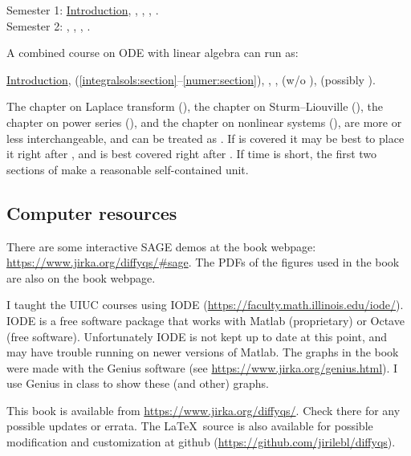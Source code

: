 \noindent
Semester 1:
\hyperref[intro:chapter]{Introduction},
,
,
,
.
\\
Semester 2: 
,
,
,
.

\medskip

A combined course on ODE with linear algebra can run as:

\medskip

\noindent
\hyperref[intro:chapter]{Introduction},
 (\ref{integralsols:section}--\ref{numer:section}),
,
,
 (w/o ), (possibly 
).

\medskip

The chapter on
Laplace transform (),
the chapter on Sturm--Liouville (),
the chapter on power series (),
and the chapter on nonlinear systems (),
are more or less interchangeable, and can be treated as .
If  is covered it may be best to place it right 
after ,
and  is best covered right after
.
If time is short, the first two sections of
 make a reasonable self-contained unit.

\subsection{Computer resources}

There are some interactive SAGE demos at the book webpage:
\url{https://www.jirka.org/diffyqs/#sage}. The PDFs of the
figures used in the book are also on the book webpage.

I taught the UIUC courses using IODE
(\url{https://faculty.math.illinois.edu/iode/}).
IODE is a free software package that
works with Matlab (proprietary) or Octave (free software).
Unfortunately IODE is not kept up to date at this point, and may have
trouble running on newer versions of Matlab.
The graphs in the book were made with
the Genius software
(see \url{https://www.jirka.org/genius.html}).  I use Genius
in class to show these (and other) graphs.

This book
is available from
\url{https://www.jirka.org/diffyqs/}.  Check there for any possible
updates or errata.  The \LaTeX\ source is also available
for possible modification and customization
at github (\url{https://github.com/jirilebl/diffyqs}).

